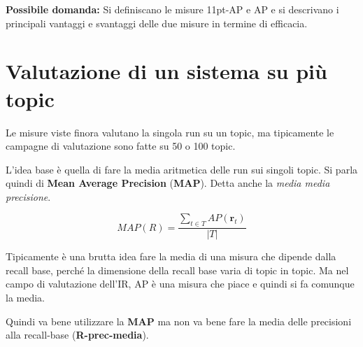 \textbf{{\color{Red} Possibile domanda:}} Si definiscano le misure 11pt-AP e AP e si descrivano i principali vantaggi e svantaggi delle due misure in termine di efficacia.

\section{Valutazione di un sistema su più topic}

Le misure viste finora valutano la singola run su un topic, ma tipicamente le campagne di valutazione sono fatte su 50 o 100 topic.

L'idea base è quella di fare la media aritmetica delle run sui singoli topic. Si parla quindi di \textbf{Mean Average Precision} (\textbf{MAP}). Detta anche la \textit{media media precisione}.

$$
MAP(R) = \frac{\sum_{t\in T}AP(\mathbf{r}_t)}{|T|}
$$

Tipicamente è una brutta idea fare la media di una misura che dipende dalla recall base, perché la dimensione della recall base varia di topic in topic. 
Ma nel campo di valutazione dell'IR, AP è una misura che piace e quindi si fa comunque la media. 

Quindi va bene utilizzare la \textbf{MAP} ma non va bene fare la media delle precisioni alla recall-base (\textbf{R-prec-media}).
